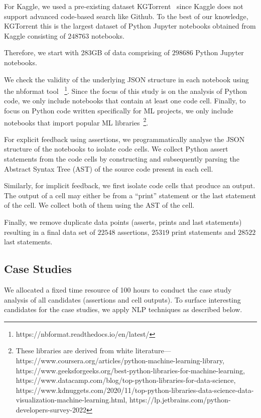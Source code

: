 For Kaggle, we used a pre-existing dataset KGTorrent~\cite{quaranta2021kgtorrent} since Kaggle does not support advanced code-based search like Github. To the best of our knowledge, KGTorrent this is the largest dataset of Python Jupyter notebooks obtained from Kaggle consisting of $248763$ notebooks.

Therefore, we start with 283GB of data comprising of $298686$ Python Jupyter notebooks.

We check the validity of the underlying JSON structure in each notebook using the nbformat tool ~\footnote{https://nbformat.readthedocs.io/en/latest/}. Since the focus of this study is on the analysis of Python code, we only include notebooks that contain at least one code cell. Finally, to focus on Python code written specifically for ML projects, we only include notebooks that import popular ML libraries~\footnote{These libraries are derived from white literature---https://www.coursera.org/articles/python-machine-learning-library, https://www.geeksforgeeks.org/best-python-libraries-for-machine-learning, https://www.datacamp.com/blog/top-python-libraries-for-data-science, https://www.kdnuggets.com/2020/11/top-python-libraries-data-science-data-visualization-machine-learning.html, https://lp.jetbrains.com/python-developers-survey-2022}.

For explicit feedback using assertions, we programmatically analyse the JSON structure of the notebooks to isolate code cells. We collect Python assert statements from the code cells by constructing and subsequently parsing the Abstract Syntax Tree (AST) of the source code present in each cell.

Similarly, for implicit feedback, we first isolate code cells that produce an output. The output of a cell may either be from a ``print'' statement or the last statement of the cell. We collect both of them using the AST of the cell.

Finally, we remove duplicate data points (asserts, prints and last statements) resulting in a final data set of $22548$ assertions, $25319$ print statements and $28522$ last statements.

\subsection{Case Studies}


We allocated a fixed time resource of 100 hours to conduct the case study analysis of all candidates (assertions and cell outputs). To surface interesting candidates for the case studies, we apply NLP techniques as described below.

